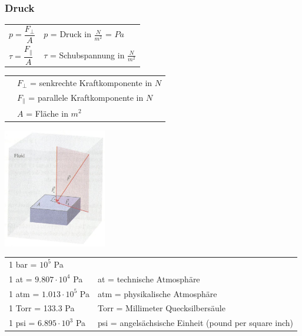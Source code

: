 	\subsubsection{Druck}
		\begin{minipage}[t]{13cm}
				\renewcommand{\arraystretch}{2.5}
				\begin{tabular}{ p{4cm} | p{7cm}}
					$p = \dfrac{F_{\perp}}{A}$	&	$p$ = Druck in $\frac{N}{m^2}$ = $Pa$\\
					$\tau = \dfrac{F_{\parallel}}{A} $	& $\tau$ = Schubspannung in $\frac{N}{m^2}$\\
				\end{tabular}
				\renewcommand{\arraystretch}{1.5}
				\begin{tabular}{ p{4cm} | p{7cm} }
					& $F_{\perp}$ = senkrechte Kraftkomponente in $N$\\
					& $F_{\parallel}$ = parallele Kraftkomponente in $N$\\
					& $A$ = Fläche in $m^2$\\
				\end{tabular} 
				\renewcommand{\arraystretch}{1}
		\end{minipage}
		\begin{minipage}[t]{5cm}
			\vspace{-\ht\strutbox}\includegraphics[width=4.5cm]{./bilder/Druck.jpg}
		\end{minipage}
		\newline
		\newline
		\begin{minipage}[t]{12cm}
				\renewcommand{\arraystretch}{1.5}
				\begin{tabular}{ p{4cm} | p{9cm}}
					1 bar = $10^5$ Pa\\
					1 at = $9.807 \cdot 10^4$ Pa	&	at = technische Atmosphäre\\
					1 atm = $1.013 \cdot 10^5$ Pa	&	atm = physikalische Atmosphäre\\
					1 Torr = 133.3 Pa	&	Torr = Millimeter Quecksilbersäule\\
					1 psi = $6.895 \cdot 10^3$ Pa	&	psi = angelsächsische Einheit (pound per square inch)\\
				\end{tabular}
				\renewcommand{\arraystretch}{1}
		\end{minipage}
